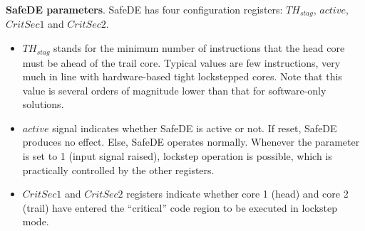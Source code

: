 \textbf{SafeDE parameters}. SafeDE has four configuration registers: $TH_{stag}$, $active$, $CritSec1$ and $CritSec2$. 
\begin{itemize}
\item $TH_{stag}$ stands for the minimum number of instructions that the head core must be ahead of the trail core. Typical values are few instructions, very much in line with hardware-based tight lockstepped cores. Note that this value is several orders of magnitude lower than that for software-only solutions. 
\item $active$ signal indicates whether SafeDE is active or not. If reset, SafeDE produces no effect. Else, SafeDE operates normally. Whenever the parameter is set to 1 (input signal raised), lockstep operation is possible, which is practically controlled by the other registers.
\item $CritSec1$ and $CritSec2$ registers indicate whether core 1 (head) and core 2 (trail) have entered the ``critical'' code region to be executed in lockstep mode. 
\end{itemize}

